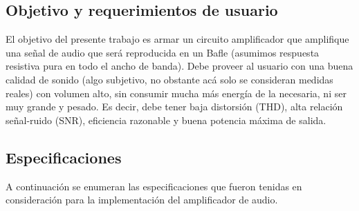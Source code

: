 \subsection{Objetivo y requerimientos de usuario}

\par El objetivo del presente trabajo es armar un circuito amplificador que amplifique una señal de audio que será reproducida en un Bafle (asumimos respuesta resistiva pura en todo el ancho de banda). Debe proveer al usuario con una buena calidad de sonido (algo subjetivo, no obstante acá solo se consideran medidas reales) con volumen alto, sin consumir mucha más energía de la necesaria, ni ser muy grande y pesado. Es decir, debe tener baja distorsión (THD), alta relación señal-ruido (SNR), eficiencia razonable y buena potencia máxima de salida.



\subsection{Especificaciones}

\par A continuación se enumeran las especificaciones que fueron tenidas en consideración para la implementación del amplificador de audio.\\


